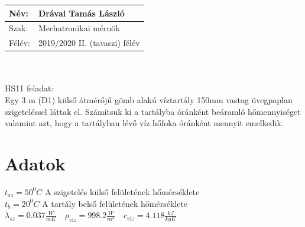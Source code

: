 \documentclass[12pt, a4paper, onecolumn]{article}
\begin{document}
\begin{tabular}{ | p{1.75cm} | p{10cm} | } 
	\hline
	Név: & Drávai Tamás László\\ 
	\hline
	Szak: & Mechatronikai mérnök \\ 
	\hline
	Félév: & 2019/2020 II. (tavaszi) félév \\ 
	\hline
\end{tabular}
\\
\\
HS11 feladat:\\
Egy 3 m (D1) külső átmérőjű gömb alakú víztartály 150mm vastag üvegpaplan szigeteléssel láttak el. Számítsuk ki a tartályba óránként beáramló hőmennyiséget valamint azt, hogy a tartályban lévő víz hőfoka óránként mennyit emelkedik.
\section*{Adatok}
$t_{sz}=50^{0}C $ A szigetelés külső felületének hőmérséklete
\\ 
$t_{b}=20^{0}C $ A tartály belső felületének hőmérséklete
\\ 
$\lambda_{sz}=0.037 \frac{W}{mK}\quad 
\rho_{víz} =998.2 \frac{W}{m^3} \quad 
c_{víz}=4.118 \frac{kJ}{kgK}$
\end{document}
